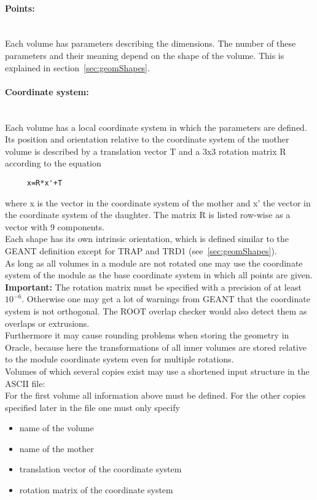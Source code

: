 \paragraph{Points:} ~\\
Each volume has parameters describing the dimensions. The number of these parameters and their meaning depend on the 
shape of the volume. This is explained in section~\ref{sec:geomShapes}.

\paragraph{Coordinate system:} ~\\
Each volume has a local coordinate system in which the parameters are defined.\\
Its position and orientation relative to the coordinate system of the mother volume is described by a translation vector T 
and a 3x3 rotation matrix R according to the equation
\begin{verbatim}
     x=R*x'+T
\end{verbatim}
where x is the vector in the coordinate system of the mother and x' the vector in the coordinate system of the daughter.
The matrix R is listed row-wise as a vector with 9 components.\\
Each shape has its own intrinsic orientation, which is defined similar to the GEANT definition except for TRAP and TRD1 
(see~\ref{sec:geomShapes}).\\
As long as all volumes in a module are not rotated one may use the coordinate system of the module as the base coordinate 
system in which all points are given.\\

\textbf{Important: } The rotation matrix must be specified with a precision of at least $10^{-6}$. Otherwise one may get a 
lot of warnings from GEANT that the coordinate system is not orthogonal. The ROOT overlap checker would also detect them 
as overlaps or extrusions.\\
Furthermore it may cause rounding problems when storing the geometry in Oracle, because here the transformations of all 
inner volumes are stored relative to the module coordinate system even for multiple rotations.\\ 

Volumes of which several copies exist may use a shortened input structure in the ASCII file:\\
For the first volume all information above must be defined. For the other copies specified later in the file one must only 
specify
\begin{itemize}
  \setlength{\itemsep}{0pt}    
  \item name of the volume
  \item name of the mother
  \item translation vector of the coordinate system
  \item rotation matrix of the coordinate system
\end{itemize}


